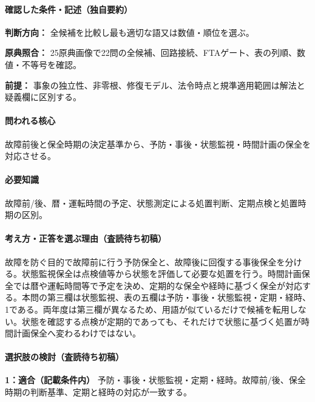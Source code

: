 \paragraph{確認した条件・記述（独自要約）}\mbox{}\par

\noindent\textbf{判断方向：} 全候補を比較し最も適切な語又は数値・順位を選ぶ。\par

\noindent\textbf{原典照合：} 25原典画像で22問の全候補、回路接続、FTAゲート、表の列順、数値・不等号を確認。\par

\noindent\textbf{前提：} 事象の独立性、非零根、修復モデル、法令時点と規準適用範囲は解法と疑義欄に区別する。\par

\paragraph{問われる核心} 故障前後と保全時期の決定基準から、予防・事後・状態監視・時間計画の保全を対応させる。

\paragraph{必要知識} 故障前/後、暦・運転時間の予定、状態測定による処置判断、定期点検と処置時期の区別。

\paragraph{考え方・正答を選ぶ理由（査読待ち初稿）} 故障を防ぐ目的で故障前に行う予防保全と、故障後に回復する事後保全を分ける。状態監視保全は点検値等から状態を評価して必要な処置を行う。時間計画保全では暦や運転時間等で予定を決め、定期的な保全や経時に基づく保全が対応する。本問の第三欄は状態監視、表の五欄は予防・事後・状態監視・定期・経時、1である。両年度は第三欄が異なるため、用語が似ているだけで候補を転用しない。状態を確認する点検が定期的であっても、それだけで状態に基づく処置が時間計画保全へ変わるわけではない。

\paragraph{選択肢の検討（査読待ち初稿）}\mbox{}\par

\noindent\textbf{1：適合（記載条件内）} 予防・事後・状態監視・定期・経時。故障前/後、保全時期の判断基準、定期と経時の対応が一致する。\par

